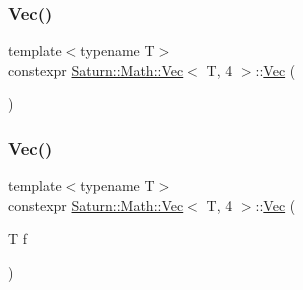 \subsubsection{\texorpdfstring{Vec()}{Vec()}\hspace{0.1cm}{\footnotesize\ttfamily [1/4]}}
{\footnotesize\ttfamily template$<$typename T$>$ \\
constexpr \mbox{\hyperlink{class_saturn_1_1_math_1_1_vec}{Saturn\+::\+Math\+::\+Vec}}$<$ T, 4 $>$\+::\mbox{\hyperlink{class_saturn_1_1_math_1_1_vec}{Vec}} (\begin{DoxyParamCaption}{ }\end{DoxyParamCaption})\hspace{0.3cm}{\ttfamily [inline]}}

\mbox{\label{class_saturn_1_1_math_1_1_vec_3_01_t_00_014_01_4_af6f94a1d867fe54efb71d7154301447e}} 
\subsubsection{\texorpdfstring{Vec()}{Vec()}\hspace{0.1cm}{\footnotesize\ttfamily [2/4]}}
{\footnotesize\ttfamily template$<$typename T$>$ \\
constexpr \mbox{\hyperlink{class_saturn_1_1_math_1_1_vec}{Saturn\+::\+Math\+::\+Vec}}$<$ T, 4 $>$\+::\mbox{\hyperlink{class_saturn_1_1_math_1_1_vec}{Vec}} (\begin{DoxyParamCaption}\item[{T}]{f }\end{DoxyParamCaption})\hspace{0.3cm}{\ttfamily [inline]}}

\mbox{\label{class_saturn_1_1_math_1_1_vec_3_01_t_00_014_01_4_a13daa8c8c6b27e37546dce035cc13e9e}} 
